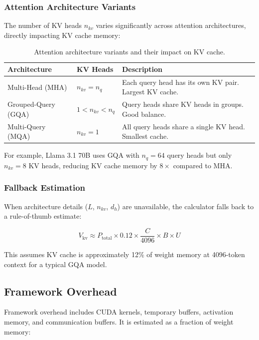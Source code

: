 \documentclass[11pt,a4paper]{article}
\theoremstyle{definition}
\begin{document}
\subsubsection{Attention Architecture Variants}

The number of KV heads $n_{kv}$ varies significantly across attention architectures, directly impacting KV cache memory:

\begin{table}[htbp]
\centering
\caption{Attention architecture variants and their impact on KV cache.}\label{tab:attention}
\begin{tabularx}{0.9\textwidth}{llX}
\toprule
\textbf{Architecture} & \textbf{KV Heads} & \textbf{Description} \\
\midrule
Multi-Head (MHA) & $n_{kv} = n_q$ & Each query head has its own KV pair. Largest KV cache. \\
Grouped-Query (GQA) & $1 < n_{kv} < n_q$ & Query heads share KV heads in groups. Good balance. \\
Multi-Query (MQA) & $n_{kv} = 1$ & All query heads share a single KV head. Smallest cache. \\
\bottomrule
\end{tabularx}
\end{table}

For example, Llama 3.1 70B uses GQA with $n_q = 64$ query heads but only $n_{kv} = 8$ KV heads, reducing KV cache memory by $8\times$ compared to MHA.

\subsubsection{Fallback Estimation}

When architecture details ($L$, $n_{kv}$, $d_h$) are unavailable, the calculator falls back to a rule-of-thumb estimate:

\begin{equation}\label{eq:kvfallback}
V_{\text{kv}} \approx P_{\text{total}} \times 0.12 \times \frac{C}{4096} \times B \times U
\end{equation}

This assumes KV cache is approximately 12\% of weight memory at 4096-token context for a typical GQA model.

\subsection{Framework Overhead}

Framework overhead includes CUDA kernels, temporary buffers, activation memory, and communication buffers. It is estimated as a fraction of weight memory:
\end{document}
